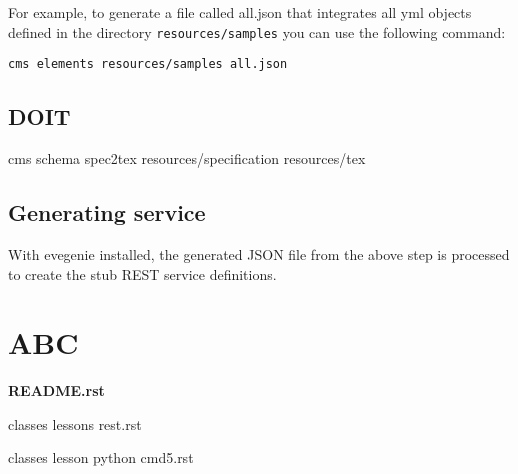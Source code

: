 \documentclass[9pt,twocolumn,twoside]{styles/osajnl}
\begin{document}
For example, to generate a file called all.json that integrates all
yml objects defined in the directory \verb+resources/samples+ you can
use the following command:

\begin{verbatim}
cms elements resources/samples all.json
\end{verbatim}

\subsection{DOIT}


cms schema spec2tex resources/specification resources/tex

\subsection{Generating service}

With evegenie installed, the generated JSON file from the above step
is processed to create the stub REST service definitions.


\section{ABC}
{\bf README.rst}

classes lessons rest.rst

classes lesson python cmd5.rst

\end{document}
